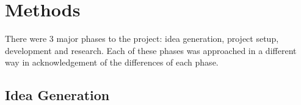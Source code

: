 
\chapter{Methods}

There were 3 major phases to the project: idea generation, project setup, development and research. Each of these phases was approached in a different way in acknowledgement of the differences of each phase.

\section{Idea Generation}


